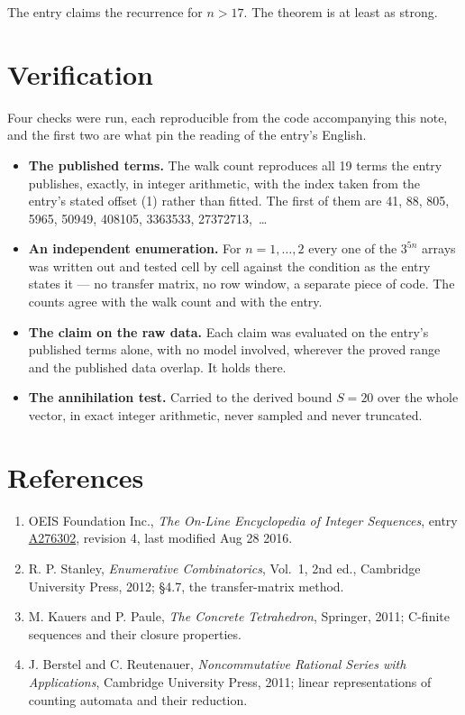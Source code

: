 \documentclass[11pt]{article}
\theoremstyle{definition}
\begin{document}
The entry claims the recurrence for $n > 17$. The theorem is at least as strong.

\section{Verification}

Four checks were run, each reproducible from the code accompanying this note, and the first two are what pin the reading of the entry's English.

\begin{itemize}

\item {\bfseries The published terms.} The walk count reproduces all 19 terms the entry publishes, exactly, in integer arithmetic, with the index taken from the entry's stated offset (1) rather than fitted. The first of them are 41, 88, 805, 5965, 50949, 408105, 3363533, 27372713,~\dots

\item {\bfseries An independent enumeration.} For $n = 1,\dots,2$ every one of the $3^{5n}$ arrays was written out and tested cell by cell against the condition as the entry states it --- no transfer matrix, no row window, a separate piece of code. The counts agree with the walk count and with the entry.

\item {\bfseries The claim on the raw data.} Each claim was evaluated on the entry's published terms alone, with no model involved, wherever the proved range and the published data overlap. It holds there.

\item {\bfseries The annihilation test.} Carried to the derived bound $S = 20$ over the whole vector, in exact integer arithmetic, never sampled and never truncated.

\end{itemize}

\section{References}

\begin{enumerate}

\item OEIS Foundation Inc., \emph{The On-Line Encyclopedia of Integer Sequences}, entry \href{https://oeis.org/A276302}{A276302}, revision 4, last modified Aug 28 2016.

\item R. P. Stanley, \emph{Enumerative Combinatorics}, Vol.~1, 2nd ed., Cambridge University Press, 2012; \S4.7, the transfer-matrix method.

\item M. Kauers and P. Paule, \emph{The Concrete Tetrahedron}, Springer, 2011; C-finite sequences and their closure properties.

\item J. Berstel and C. Reutenauer, \emph{Noncommutative Rational Series with Applications}, Cambridge University Press, 2011; linear representations of counting automata and their reduction.

\end{enumerate}
\end{document}

